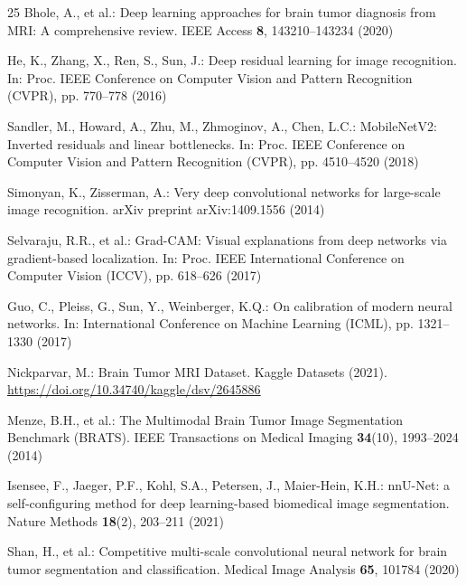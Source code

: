 \documentclass[runningheads]{llncs}
\begin{document}
\begin{thebibliography}{25}
Bhole, A., et al.: Deep learning approaches for brain tumor diagnosis from MRI: A comprehensive review. IEEE Access \textbf{8}, 143210--143234 (2020)

He, K., Zhang, X., Ren, S., Sun, J.: Deep residual learning for image recognition. In: Proc. IEEE Conference on Computer Vision and Pattern Recognition (CVPR), pp. 770--778 (2016)

Sandler, M., Howard, A., Zhu, M., Zhmoginov, A., Chen, L.C.: MobileNetV2: Inverted residuals and linear bottlenecks. In: Proc. IEEE Conference on Computer Vision and Pattern Recognition (CVPR), pp. 4510--4520 (2018)

Simonyan, K., Zisserman, A.: Very deep convolutional networks for large-scale image recognition. arXiv preprint arXiv:1409.1556 (2014)

Selvaraju, R.R., et al.: Grad-CAM: Visual explanations from deep networks via gradient-based localization. In: Proc. IEEE International Conference on Computer Vision (ICCV), pp. 618--626 (2017)

Guo, C., Pleiss, G., Sun, Y., Weinberger, K.Q.: On calibration of modern neural networks. In: International Conference on Machine Learning (ICML), pp. 1321--1330 (2017)

Nickparvar, M.: Brain Tumor MRI Dataset. Kaggle Datasets (2021). \url{https://doi.org/10.34740/kaggle/dsv/2645886}

Menze, B.H., et al.: The Multimodal Brain Tumor Image Segmentation Benchmark (BRATS). IEEE Transactions on Medical Imaging \textbf{34}(10), 1993--2024 (2014)

Isensee, F., Jaeger, P.F., Kohl, S.A., Petersen, J., Maier-Hein, K.H.: nnU-Net: a self-configuring method for deep learning-based biomedical image segmentation. Nature Methods \textbf{18}(2), 203--211 (2021)

Shan, H., et al.: Competitive multi-scale convolutional neural network for brain tumor segmentation and classification. Medical Image Analysis \textbf{65}, 101784 (2020)


\end{thebibliography}
\end{document}

